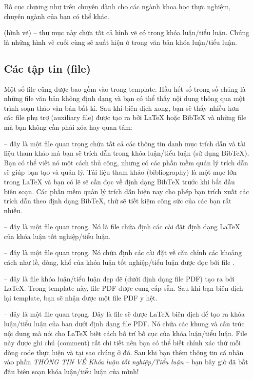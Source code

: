 Bố cục chương như trên chuyên dành cho các ngành khoa học thực nghiệm, chuyên ngành của bạn có thể khác.

 (hình vẽ) -- thư mục này chứa tất cả hình vẽ có trong khóa luận/tiểu luận. Chúng là những hình vẽ cuối cùng sẽ xuất hiện ở trong văn bản khóa luận/tiểu luận.


\subsection{Các tập tin (file)}

Một số file cũng được bao gồm vào trong template. Hầu hết số trong số chúng là những file văn bản không định dạng và bạn có thể thấy nội dung thông qua một trình soạn thảo văn bản bất kì. Sau khi biên dịch xong, bạn sẽ thấy nhiều hơn các file phụ trợ (auxiliary file) được tạo ra bởi \LaTeX{} hoặc BibTeX và những file mà bạn không cần phải xóa hay quan tâm:

 -- đây là một file quan trọng chứa tất cả các thông tin danh mục trích dẫn và tài liệu tham khảo mà bạn sẽ trích dẫn trong khóa luận/tiểu luận (sử dụng BibTeX). Bạn có thể viết nó một cách thủ công, nhưng có các phần mềm quản lý trích dẫn sẽ giúp bạn tạo và quản lý. Tài liệu tham khảo (bibliography) là một mục lớn trong \LaTeX{} và bạn có lẽ sẽ cần đọc về định dạng BibTeX trước khi bắt đầu biên soạn. Các phần mềm quản lý trích dẫn hiện nay cho phép bạn trích xuất các trích dẫn theo định dạng BibTeX, thứ sẽ tiết kiệm công sức của các bạn rất nhiều.

 -- đây là một file quan trọng. Nó là file chứa định các cài đặt định dạng \LaTeX{} của khóa luận tốt nghiệp/tiểu luận.

 -- đây là một file quan trọng. Nó chứa định các cài đặt về căn chỉnh các khoảng cách như lề, dòng, khổ của khóa luận tốt nghiệp/tiểu luận được đọc bởi file .

 -- đây là file khóa luận/tiểu luận đẹp đẽ (dưới định dạng file PDF) tạo ra bởi \LaTeX{}. Trong template này, file PDF được cung cấp sẵn. Sau khi bạn biên dịch lại template, bạn sẽ nhận được một file PDF y hệt.

 -- đây là một file quan trọng. Đây là file sẽ được \LaTeX{} biên dịch để tạo ra khóa luận/tiểu luận của bạn dưới định dạng file PDF. Nó chứa các khung và cấu trúc nội dung mà nói cho \LaTeX{} biết cách bố trí bố cục của khóa luận/tiểu luận. File này được ghi chú (comment) rất chi tiết nên bạn có thể biết chính xác thứ mỗi dòng code thực hiện và tại sao chúng ở đó. Sau khi bạn thêm thông tin cá nhân vào phần \emph{THÔNG TIN VỀ Khóa luận tốt nghiệp/Tiểu luận} -- bạn bây giờ đã bắt đầu biên soạn khóa luận/tiểu luận của mình!

